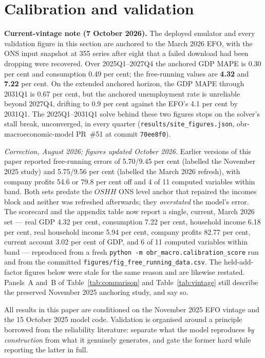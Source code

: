 \section{Calibration and validation}

\noindent\textbf{Current-vintage note (7 October 2026).} The deployed emulator and every validation figure in this section are anchored to the March 2026 EFO, with the ONS input snapshot at 355 series after eight that a failed download had been dropping were recovered. Over 2025Q1--2027Q4 the anchored GDP MAPE is 0.30 per cent and consumption 0.49 per cent; the free-running values are \textbf{4.32} and \textbf{7.22} per cent. On the extended anchored horizon, the GDP MAPE through 2031Q1 is 0.67 per cent, but the anchored unemployment rate is unreliable beyond 2027Q4, drifting to 0.9 per cent against the EFO's 4.1 per cent by 2031Q1. The 2025Q1--2031Q1 solve behind these two figures stops on the solver's stall break, unconverged, in every quarter (\texttt{results/site\_figures.json}, obr-macroeconomic-model PR~\#51 at commit \texttt{70ee8f0}).

\emph{Correction, August 2026; figures updated October 2026.} Earlier versions of this paper reported free-running errors of 5.70/9.45 per cent (labelled the November 2025 study) and 5.75/9.56 per cent (labelled the March 2026 refresh), with company profits 54.6 or 79.8 per cent off and 4 of 11 computed variables within band. Both sets predate the $OSHH$ ONS level anchor that repaired the incomes block and neither was refreshed afterwards; they \emph{overstated} the model's error. The scorecard and the appendix table now report a single, current, March 2026 set --- real GDP 4.32 per cent, consumption 7.22 per cent, household income 6.18 per cent, real household income 5.94 per cent, company profits 82.77 per cent, current account 3.02 per cent of GDP, and 6 of 11 computed variables within band --- reproduced from a fresh \texttt{python -m obr\_macro.calibration\_score} run and from the committed \texttt{figures/fig\_free\_running\_data.csv}. The held-add-factor figures below were stale for the same reason and are likewise restated. Panels~A and~B of Table~\ref{tab:comparison} and Table~\ref{tab:vintage} still describe the preserved November 2025 anchoring study, and say so.

\label{sec:calibration}

All results in this paper are conditioned on the November 2025 EFO vintage \citep{obr2025efo} and the 15 October 2025 model code. Validation is organised around a principle borrowed from the reliability literature: separate what the model reproduces \emph{by construction} from what it genuinely generates, and gate the former hard while reporting the latter in full.

